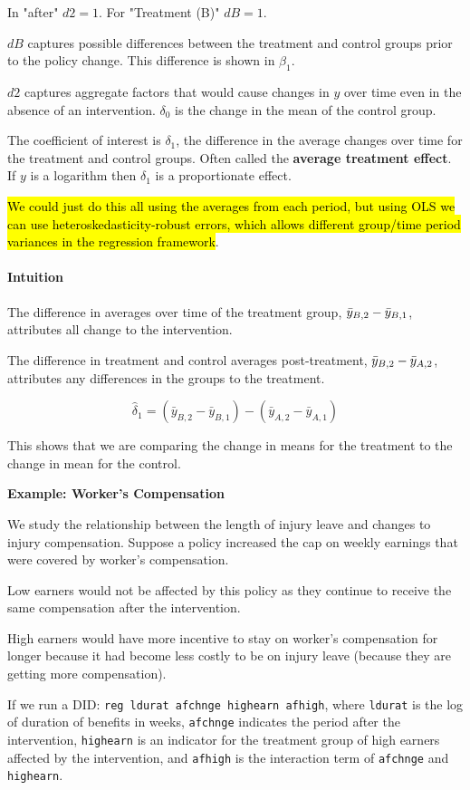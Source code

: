 \documentclass[11pt]{article}
\begin{document}
In "after" $d2=1$. For "Treatment (B)" $dB=1$.

$dB$ captures possible differences between the treatment and control groups prior to the policy change. This difference is shown in $\beta_1$.

$d2$ captures aggregate factors that would cause changes in $y$ over time even in the absence of an intervention. $\delta_0$ is the change in the mean of the control group.

The coefficient of interest is $\delta_1$, the difference in the average changes over time for the treatment and control groups. Often called the \textbf{average treatment effect}. If $y$ is a logarithm then $\delta_1$ is a proportionate effect.

\hl{We could just do this all using the averages from each period, but using OLS we can use heteroskedasticity-robust errors, which allows different group/time period variances in the regression framework}.

\begin{shaded}
\paragraph{Intuition} \mbox{}

The difference in averages over time of the treatment group, $\Bar{y}_{B,2} - \Bar{y}_{B,1}$, attributes all change to the intervention.

The difference in treatment and control averages post-treatment, $\Bar{y}_{B,2} - \Bar{y}_{A,2}$, attributes any differences in the groups to the treatment.

\[\hat{\delta}_1=\left(\bar{y}_{B, 2}-\bar{y}_{B, 1}\right)-\left(\bar{y}_{A, 2}-\bar{y}_{A, 1}\right)\]

This shows that we are comparing the change in means for the treatment to the change in mean for the control.
    
\end{shaded}

\begin{mdframed}
    \textbf{Example: Worker's Compensation}

    We study the relationship between the length of injury leave and changes to injury compensation. Suppose a policy increased the cap on weekly earnings that were covered by worker's compensation.

    Low earners would not be affected by this policy as they continue to receive the same compensation after the intervention. 

    High earners would have more incentive to stay on worker's compensation for longer because it had become less costly to be on injury leave (because they are getting more compensation).

    If we run a DID: \lstinline{reg ldurat afchnge highearn afhigh}, where \lstinline{ldurat} is the log of duration of benefits in weeks, \lstinline{afchnge} indicates the period after the intervention, \lstinline{highearn} is an indicator for the treatment group of high earners affected by the intervention, and \lstinline{afhigh} is the interaction term of \lstinline{afchnge} and \lstinline{highearn}. 
\end{mdframed}
\end{document}
